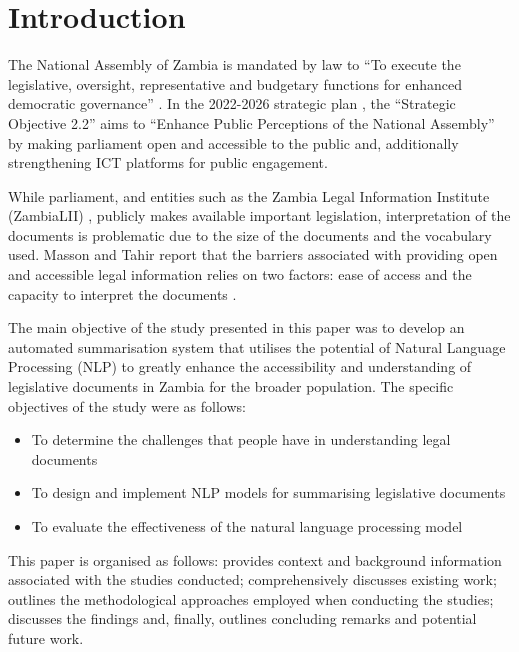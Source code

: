 \documentclass[conference]{IEEEtran}
\begin{document}
\section{Introduction}
\label{sec:introduction}
The National Assembly of Zambia is mandated by law to “To execute the legislative, oversight, representative and budgetary functions for enhanced democratic governance” \cite{NationalAssembly2023Objectives}. In the 2022-2026 strategic plan \cite{NationalAssembly2021Strategic}, the “Strategic Objective 2.2” aims to “Enhance Public Perceptions of the National Assembly” by making parliament open and accessible to the public and, additionally strengthening ICT platforms for public engagement.

While parliament, and entities such as the Zambia Legal Information Institute (ZambiaLII) \cite{ZambiaLII2024Website}, publicly makes available important legislation, interpretation of the documents is problematic due to the size of the documents and the vocabulary used. Masson and Tahir report that the barriers associated with providing open and accessible legal information relies on two factors: ease of access and the capacity to interpret the documents \cite{Masson2016Legal}.

The main objective of the study presented in this paper was to develop an automated summarisation system that utilises the potential of Natural Language Processing (NLP) to greatly enhance the accessibility and understanding of legislative documents in Zambia for the broader population. The specific objectives of the study were as follows:
\begin{itemize}
    \item To determine the challenges that people have in understanding legal documents
    \item To design and implement NLP models for summarising legislative documents
    \item To evaluate the effectiveness of the natural language processing model
\end{itemize}

This paper is organised as follows:  provides context and background information associated with the studies conducted;  comprehensively discusses existing work;  outlines the methodological approaches employed when conducting the studies;  discusses the findings and, finally,  outlines concluding remarks and potential future work.
\end{document}
